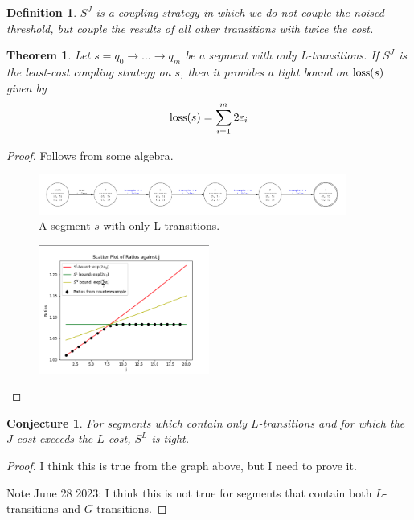\documentclass{article}
\newtheorem{theorem}{Theorem}
\newtheorem{conjecture}{Conjecture}[section]
\newtheorem{definition}{Definition}[section]
\renewcommand{\epsilon}{\varepsilon}
\newcommand{\loss}{\textup{loss}}
\newcommand{\1}{\langle 1 \rangle}
\newcommand{\2}{\langle 2 \rangle}
\begin{document}
\begin{definition}
    $S^J$ is a coupling strategy in which we do not couple the noised threshold, but couple the results of all other transitions with twice the cost. 
\end{definition}

\begin{theorem}
    Let $s = q_0 \to \dots \to q_m$ be a segment with only L-transitions. If $S^J$ is the least-cost coupling strategy on $s$, then it provides a tight bound on $\loss(s)$ given by \[\loss(s) = \sum_{i = 1}^{m} 2\epsilon_i\]
\end{theorem}

\begin{proof}
    Follows from some algebra.

    \begin{figure}[H]
        \centering
        \includegraphics[width=0.9\textwidth]{figures/only_l_transitions.png}
        \caption{A segment $s$ with only L-transitions.}
        \label{fig:segment_j}
    \end{figure}

    \begin{figure}[H]
        \centering
        \includegraphics[width=0.5\textwidth]{figures/only_l_transitions_plot.png}
        \caption{}
        \label{fig:segment_j_coupling}
    \end{figure}
\end{proof}

\begin{conjecture}
    For segments which contain only $L$-transitions and for which the $J$-cost exceeds the $L$-cost, $S^L$ is tight.
\end{conjecture}

\begin{proof}
    I think this is true from the graph above, but I need to prove it.

    Note June 28 2023: I think this is not true for segments that contain both $L$-transitions and $G$-transitions.
\end{proof}
\end{document}
